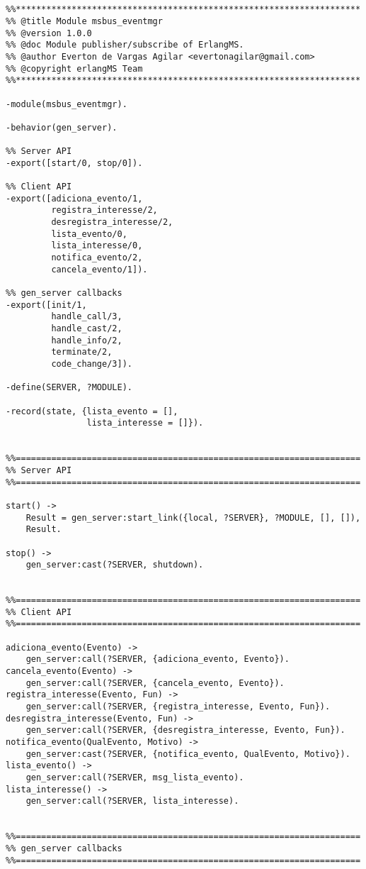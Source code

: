 \begin{lstlisting} 


%%********************************************************************
%% @title Module msbus_eventmgr
%% @version 1.0.0
%% @doc Module publisher/subscribe of ErlangMS.
%% @author Everton de Vargas Agilar <evertonagilar@gmail.com>
%% @copyright erlangMS Team
%%********************************************************************

-module(msbus_eventmgr).

-behavior(gen_server).

%% Server API
-export([start/0, stop/0]).

%% Client API
-export([adiciona_evento/1, 
		 registra_interesse/2, 
		 desregistra_interesse/2, 
		 lista_evento/0, 
		 lista_interesse/0, 
		 notifica_evento/2,
		 cancela_evento/1]).

%% gen_server callbacks
-export([init/1, 
	     handle_call/3, 
	     handle_cast/2, 
	     handle_info/2, 
	     terminate/2, 
	     code_change/3]).

-define(SERVER, ?MODULE).

-record(state, {lista_evento = [], 
			    lista_interesse = []}).


%%====================================================================
%% Server API
%%====================================================================

start() ->
    Result = gen_server:start_link({local, ?SERVER}, ?MODULE, [], []),
    Result.
 
stop() ->
    gen_server:cast(?SERVER, shutdown).
 
 
%%====================================================================
%% Client API
%%====================================================================
 
adiciona_evento(Evento) -> 
	gen_server:call(?SERVER, {adiciona_evento, Evento}). 
cancela_evento(Evento) -> 
	gen_server:call(?SERVER, {cancela_evento, Evento}). 
registra_interesse(Evento, Fun) -> 
	gen_server:call(?SERVER, {registra_interesse, Evento, Fun}). 
desregistra_interesse(Evento, Fun) -> 
	gen_server:call(?SERVER, {desregistra_interesse, Evento, Fun}). 
notifica_evento(QualEvento, Motivo) -> 
	gen_server:cast(?SERVER, {notifica_evento, QualEvento, Motivo}). 
lista_evento() -> 
	gen_server:call(?SERVER, msg_lista_evento). 
lista_interesse() -> 
	gen_server:call(?SERVER, lista_interesse). 


%%====================================================================
%% gen_server callbacks
%%====================================================================
 

\end{lstlisting}
